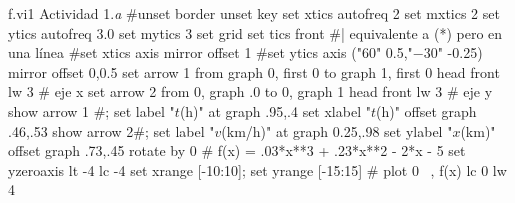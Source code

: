 \begin{plot}{1.1}{f.vi1}
  {Actividad 1.\textit{a}}
  #unset border
  unset key
  set xtics autofreq 2
  set mxtics 2
  set ytics autofreq 3.0
  set mytics 3
  set grid
  set tics front    #| equivalente a (*) pero en una línea
  #set xtics axis mirror offset 1
  #set ytics axis ("$60$" 0.5,"$-30$" -0.25) mirror offset 0,0.5
  set arrow 1 from graph 0, first 0 to graph 1, first 0 head front lw 3 # eje x
  set arrow 2 from 0, graph .0 to 0, graph 1 head front lw 3		# eje y 
  show arrow 1 #; set label "$t$(h)" at graph .95,.4
  set xlabel "$t$(h)" offset  graph .46,.53
  show arrow 2#; set label "$v$(km/h)" at graph 0.25,.98 
  set ylabel "$x$(km)" offset graph .73,.45 rotate by 0
  #
  f(x) = .03*x**3 + .23*x**2 - 2*x - 5
  set yzeroaxis lt -4 lc -4
  set xrange [-10:10]; set yrange [-15:15]
  #
  plot  0 \
  , f(x) lc 0 lw 4 \
\end{plot}

